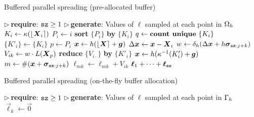 \begin{algorithm}
\caption{Buffered parallel spreading (pre-allocated buffer)}
\label{algo:pa-spread}
\begin{algorithmic}[1]
\State $\triangleright\ $\textbf{require}: $\texttt{sz} \ge 1$
\State $\triangleright\ $\textbf{generate}: Values of $\ell$ sampled at each point in $\Omega_h$
 
    \State $K_i \gets \kappa(\left\lfloor{\boldsymbol{X}_i}\right\rceil)$ 
    \State $P_i \gets i$ 
\EndFor
\State \textbf{sort} $\{P_i\}$ \textbf{by} $\{K_i\}$
\State $q \gets \text{\textbf{count unique} }\{K_i\}$
 
    \State $\{K'_i\} \gets \{K_i\}$
     
        \State $p \gets P_i$
        \State $\boldsymbol{x} \gets h(\left\lfloor{\boldsymbol{X}}\right\rceil+\boldsymbol{g})$
        \State $\Delta\boldsymbol{x} \gets \boldsymbol{x}-\boldsymbol{X}_i$
            \State $w \gets \delta_h(\Delta\boldsymbol{x}+h\boldsymbol{\sigma}_{\texttt{sz}\cdot j + k})$
            \State $V_{ik} \gets w \cdot L(\boldsymbol{X}_p)$ 
        \EndFor
    \EndFor
    \State \textbf{reduce} $\{V_{i\cdot}\}$ \textbf{by} $\{K'_i\}$
     
        \State $\boldsymbol{x} \gets h(\kappa^{-1}(K'_i) + \boldsymbol{g})$
            \State $m \gets \#(\boldsymbol{x} + \boldsymbol{\sigma}_{\texttt{sz}\cdot j + k})$
                \State $\ell_{mk} \gets \ell_{mk} + V_{ik}$
            \EndIf
        \EndFor
    \EndFor
\EndFor
\State \Return $\boldsymbol{\ell}_1 + \cdots + \boldsymbol{\ell}_{\texttt{sz}}$
\EndProcedure
\end{algorithmic}
\end{algorithm}

\begin{algorithm}
\caption{Buffered parallel spreading (on-the-fly buffer allocation)}
\label{algo:otf-spread}
\begin{algorithmic}[1]
\State $\triangleright\ $\textbf{require}: $\texttt{sz} \ge 1$
\State $\triangleright\ $\textbf{generate}: Values of $\ell$ sampled at each point in $\Gamma_h$
    \State $\vec{\ell}_k \gets \vec{0}$
\EndFor
\State \Return {} 
\EndProcedure {}
\end{algorithmic}
\end{algorithm}


